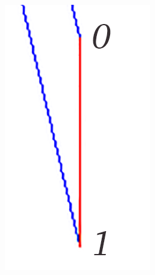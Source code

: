 \documentclass[a4paper, 11pt, oneside]{report}
\begin{document}
\begin{figure}[H]
	\centering
	\begin{subfigure}{.125\textwidth}
		\centering
		\includegraphics[width=\linewidth]{figs/outlet_minifigure.png}
	\end{subfigure}
	\begin{subfigure}{.45\textwidth}
		\centering

\end{subfigure}
\end{figure}
\end{document}
